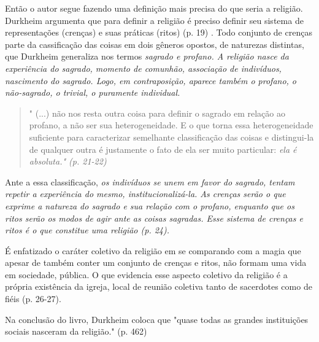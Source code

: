 \documentclass[12pt,a4paper]{article}
\begin{document}
Então o autor segue fazendo uma definição mais precisa do que seria a religião. Durkheim argumenta que para definir a religião é preciso definir seu sistema de representações (crenças) e suas práticas (ritos) (p. 19) . Todo conjunto de crenças parte da cassificação das coisas em dois gêneros opostos, de naturezas distintas, que Durkheim generaliza nos termos \em sagrado \em e \em profano\em . A religião nasce da experiência do sagrado, momento de comunhão, associação de indivíduos, nascimento do sagrado. Logo, em contraposição, aparece também o profano, o não-sagrado, o trivial, o puramente individual.
\begin{quote}
    " (...) não nos resta outra coisa para definir o sagrado em relação ao profano, a não ser sua heterogeneidade. E o que torna essa heterogeneidade suficiente para caracterizar semelhante classificação das coisas e distingui-la de qualquer outra é justamente o fato de ela ser muito particular: \em ela é absoluta\em ." (p. 21-22)
\end{quote}
Ante a essa classificação, \em os indivíduos se unem em favor do sagrado\em , tentam repetir a experiência do mesmo, institucionalizá-la. As crenças serão o que exprime a natureza do sagrado e sua relação com o profano, enquanto que os ritos serão os modos de agir ante as coisas sagradas. Esse sistema de crenças e ritos é o que constitue uma religião (p. 24).

É enfatizado o caráter coletivo da religião em se comparando com a magia que apesar de também conter um conjunto de crenças e ritos, não formam uma vida em sociedade, pública. O que evidencia esse aspecto coletivo da religião é a própria existência da igreja, local de reunião coletiva tanto de sacerdotes como de fiéis (p. 26-27).

Na conclusão do livro, Durkheim coloca que "quase todas as grandes instituições sociais nasceram da religião."
(p. 462)
\end{document}

